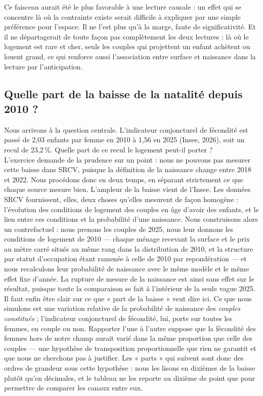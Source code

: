\documentclass[12pt,a4paper]{article}
\begin{document}
\noindent Ce faisceau aurait été le plus favorable à une lecture causale : un effet qui se concentre là où la contrainte existe serait difficile à expliquer par une simple préférence pour l'espace. Il ne l'est plus qu'à la marge, faute de significativité. Et il ne départagerait de toute façon pas complètement les deux lectures : là où le logement est rare et cher, seuls les couples qui projettent un enfant achètent ou louent grand, ce qui renforce aussi l'association entre surface et naissance dans la lecture par l'anticipation.

\subsection{Quelle part de la baisse de la natalité depuis 2010 ?}\label{sec:decompo}

Nous arrivons à la question centrale. L'indicateur conjoncturel de fécondité est passé de 2,03 enfants par femme en 2010 à 1,56 en 2025 (Insee, 2026), soit un recul de 23,2\,\%. Quelle part de ce recul le logement peut-il porter ? \\

\noindent L'exercice demande de la prudence sur un point : nous ne pouvons pas mesurer cette baisse dans SRCV, puisque la définition de la naissance change entre 2018 et 2022. Nous procédons donc en deux temps, en séparant strictement ce que chaque source mesure bien. L'ampleur de la baisse vient de l'Insee. Les données SRCV fournissent, elles, deux choses qu'elles mesurent de façon homogène : l'évolution des conditions de logement des couples en âge d'avoir des enfants, et le lien entre ces conditions et la probabilité d'une naissance. Nous construisons alors un contrefactuel : nous prenons les couples de 2025, nous leur donnons les conditions de logement de 2010 — chaque ménage recevant la surface et le prix au mètre carré situés au même rang dans la distribution de 2010, et la structure par statut d'occupation étant ramenée à celle de 2010 par repondération — et nous recalculons leur probabilité de naissance avec le même modèle et le même effet fixe d'année. La rupture de mesure de la naissance est ainsi sans effet sur le résultat, puisque toute la comparaison se fait à l'intérieur de la seule vague 2025. \\

\noindent Il faut enfin être clair sur ce que « part de la baisse » veut dire ici. Ce que nous simulons est une variation relative de la probabilité de naissance des \textit{couples constitués} ; l'indicateur conjoncturel de fécondité, lui, porte sur toutes les femmes, en couple ou non. Rapporter l'une à l'autre suppose que la fécondité des femmes hors de notre champ aurait varié dans la même proportion que celle des couples — une hypothèse de transposition proportionnelle que rien ne garantit et que nous ne cherchons pas à justifier. Les « parts » qui suivent sont donc des ordres de grandeur sous cette hypothèse : nous les lisons en dixièmes de la baisse plutôt qu'en décimales, et le tableau ne les reporte au dixième de point que pour permettre de comparer les canaux entre eux. \\
\end{document}
